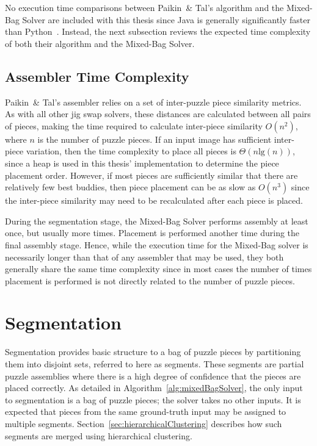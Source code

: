 No execution time comparisons between Paikin~\& Tal's algorithm and the Mixed-Bag Solver are included with this thesis since Java is generally significantly faster than Python~\cite{pythonJavaComparison}.  Instead, the next subsection reviews the expected time complexity of both their algorithm and the Mixed-Bag Solver.

\subsection{Assembler Time Complexity}\label{sec:assemblerTimeComplexity}

Paikin~\& Tal's assembler relies on a set of inter-puzzle piece similarity metrics.  As with all other jig swap solvers, these distances are calculated between all pairs of pieces, making the time required to calculate inter-piece similarity $O(n^2)$, where $n$ is the number of puzzle pieces.  If an input image has sufficient inter-piece variation, then the time complexity to place all pieces is $\Theta(n \text{lg}(n))$, since a heap is used in this thesis' implementation to determine the piece placement order.  However, if most pieces are sufficiently similar that there are relatively few best buddies, then piece placement can be as slow as $O(n^3)$ since the inter-piece similarity may need to be recalculated after each piece is placed.

During the segmentation stage, the Mixed-Bag Solver performs assembly at least once, but usually more times.  Placement is performed another time during the final assembly stage.  Hence, while the execution time for the Mixed-Bag solver is necessarily longer than that of any assembler that may be used, they both generally share the same time complexity since in most cases the number of times placement is performed is not directly related to the number of puzzle pieces.

\section{Segmentation}\label{sec:Segmentation}

Segmentation provides basic structure to a bag of puzzle pieces by partitioning them into disjoint sets, referred to here as segments.  These segments are partial puzzle assemblies where there is a high degree of confidence that the pieces are placed correctly. As detailed in Algorithm~\ref{alg:mixedBagSolver}, the only input to segmentation is a bag of puzzle pieces; the solver takes no other inputs.  It is expected that pieces from the same ground-truth input may be assigned to multiple segments.  Section~\ref{sec:hierarchicalClustering} describes how such segments are merged using hierarchical clustering.

